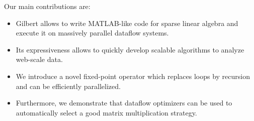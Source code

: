 Our main contributions are:
\begin{itemize}
 \item Gilbert allows to write MATLAB-like code for sparse linear algebra and execute it on massively parallel dataflow systems.
 \item Its expressiveness allows to quickly develop scalable algorithms to analyze web-scale data.
 \item We introduce a novel fixed-point operator which replaces loops by recursion and can be efficiently parallelized.
 \item Furthermore, we demonstrate that dataflow optimizers can be used to automatically select a good matrix multiplication strategy. 
\end{itemize}



